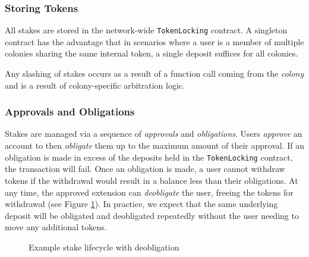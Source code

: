 \subsubsection{Storing Tokens}

All stakes are stored in the network-wide \texttt{TokenLocking} contract. A singleton contract has the advantage that in scenarios where a user is a member of multiple colonies sharing the same internal token, a single deposit suffices for all colonies.

Any slashing of stakes occurs as a result of a function call coming from the \textit{colony} and is a result of colony-specific arbitration logic.

\subsubsection{Approvals and Obligations}

Stakes are managed via a sequence of \textit{approvals} and \textit{obligations}. Users \textit{approve} an account to then \textit{obligate} them up to the maximum amount of their approval. If an obligation is made in excess of the deposits held in the \texttt{TokenLocking} contract, the transaction will fail. Once an obligation is made, a user cannot withdraw tokens if the withdrawal would result in a balance less than their obligations. At any time, the approved extension can \textit{deobligate} the user, freeing the tokens for withdrawal (see Figure \ref{fig:stake-deobligate}). In practice, we expect that the same underlying deposit will be obligated and deobligated repeatedly without the user needing to move any additional tokens.

\begin{figure}[h]
    \centering
{}
 \caption{Example stake lifecycle with deobligation}
 \label{fig:stake-deobligate}
\end{figure}

